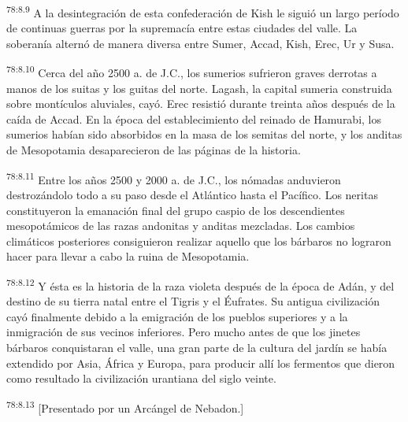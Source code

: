 \par
\textsuperscript{78:8.9} A la desintegración de esta confederación de Kish le siguió un largo período de continuas guerras por la supremacía entre estas ciudades del valle. La soberanía alternó de manera diversa entre Sumer, Accad, Kish, Erec, Ur y Susa.

\par
\textsuperscript{78:8.10} Cerca del año 2500 a. de J.C., los sumerios sufrieron graves derrotas a manos de los suitas y los guitas del norte. Lagash, la capital sumeria construida sobre montículos aluviales, cayó. Erec resistió durante treinta años después de la caída de Accad. En la época del establecimiento del reinado de Hamurabi, los sumerios habían sido absorbidos en la masa de los semitas del norte, y los anditas de Mesopotamia desaparecieron de las páginas de la historia.

\par
\textsuperscript{78:8.11} Entre los años 2500 y 2000 a. de J.C., los nómadas anduvieron destrozándolo todo a su paso desde el Atlántico hasta el Pacífico. Los neritas constituyeron la emanación final del grupo caspio de los descendientes mesopotámicos de las razas andonitas y anditas mezcladas. Los cambios climáticos posteriores consiguieron realizar aquello que los bárbaros no lograron hacer para llevar a cabo la ruina de Mesopotamia.

\par
\textsuperscript{78:8.12} Y ésta es la historia de la raza violeta después de la época de Adán, y del destino de su tierra natal entre el Tigris y el Éufrates. Su antigua civilización cayó finalmente debido a la emigración de los pueblos superiores y a la inmigración de sus vecinos inferiores. Pero mucho antes de que los jinetes bárbaros conquistaran el valle, una gran parte de la cultura del jardín se había extendido por Asia, África y Europa, para producir allí los fermentos que dieron como resultado la civilización urantiana del siglo veinte.

\par
\textsuperscript{78:8.13} [Presentado por un Arcángel de Nebadon.]